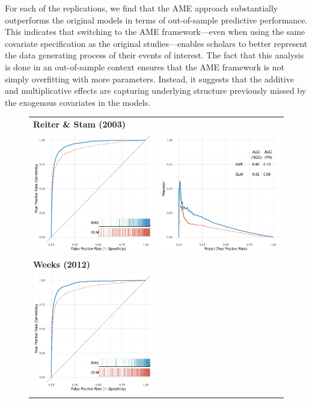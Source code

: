 For each of the replications, we find that the AME approach substantially outperforms the original models in terms of out-of-sample predictive performance. This indicates that switching to the AME framework---even when using the same covariate specification as the original studies---enables scholars to better represent the data generating process of their events of interest. The fact that this analysis is done in an out-of-sample context ensures that the AME framework is not simply overfitting with more parameters. Instead, it suggests that the additive and multiplicative effects are capturing underlying structure previously missed by the exogenous covariates in the models.

\begin{figure}
	\centering
	\begin{tabular}{cc}
		\multicolumn{2}{l}{\textbf{\tiny{Reiter \& Stam (2003)}}} \\
		\includegraphics[width=.4\textwidth]{graphics/figure6_reiter_stam_roc_outSample.pdf} &
		\includegraphics[width=.4\textwidth]{graphics/figure6_reiter_stam_pr_outSample.pdf} \\
		\multicolumn{2}{l}{\textbf{\tiny{Weeks (2012)}}} \\
		\includegraphics[width=.4\textwidth]{graphics/figure6_weeks_roc_outSample.pdf} &

\end{tabular}
\end{figure}
